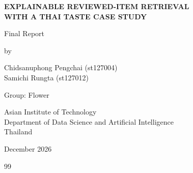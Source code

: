 \documentclass[12pt]{report}
\begin{document}
\begin{titlepage}
\singlespacing
\begin{center}
\vspace*{1.2cm}
{\LARGE\textbf{EXPLAINABLE REVIEWED-ITEM RETRIEVAL\\WITH A THAI TASTE CASE STUDY}}

\vspace{1cm}
{\large Final Report}

\vspace{2cm}
by

\vspace{0.5cm}
{\large Chidsanuphong Pengchai (st127004)}\\[6pt]
{\large Samichi Rungta (st127012)}

\vspace{1.5cm}
Group: Flower

\vspace{2cm}
Asian Institute of Technology\\
Department of Data Science and Artificial Intelligence\\
Thailand

\vspace{1cm}
December 2026
\end{center}
\end{titlepage}

\singlespacing
\tableofcontents
\listoffigures
\listoftables
\clearpage
\onehalfspacing










\clearpage
\singlespacing
\begin{thebibliography}{99}

\end{thebibliography}
\end{document}
